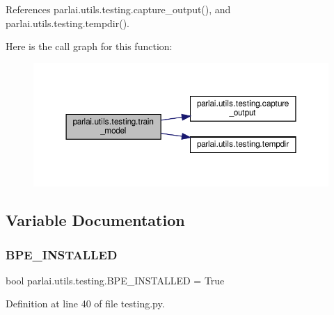 References parlai.\+utils.\+testing.\+capture\+\_\+output(), and parlai.\+utils.\+testing.\+tempdir().

Here is the call graph for this function\+:
\nopagebreak
\begin{figure}[H]
\begin{center}
\leavevmode
\includegraphics[width=350pt]{namespaceparlai_1_1utils_1_1testing_a005734981469efed8a992bf5edc3ca8a_cgraph}
\end{center}
\end{figure}


\subsection{Variable Documentation}
\mbox{\label{namespaceparlai_1_1utils_1_1testing_a54ab3fcb6f56b6b83d27ed5aa62148da}} 
\subsubsection{\texorpdfstring{B\+P\+E\+\_\+\+I\+N\+S\+T\+A\+L\+L\+ED}{BPE\_INSTALLED}}
{\footnotesize\ttfamily bool parlai.\+utils.\+testing.\+B\+P\+E\+\_\+\+I\+N\+S\+T\+A\+L\+L\+ED = True}



Definition at line 40 of file testing.\+py.

\mbox{\label{namespaceparlai_1_1utils_1_1testing_aca36857f73d37ca56704f812c05a3b13}} 
